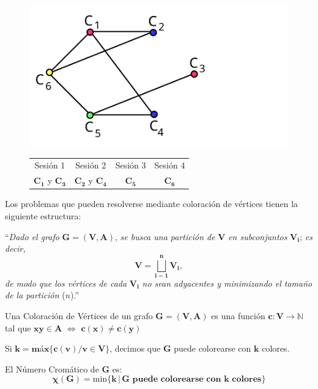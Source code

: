 \documentclass[twoside]{report}
\newcommand{\bs}[1]{\boldsymbol{#1}}
\begin{document}
           \begin{figure}[h!]\centering
           \includegraphics[scale=0.3]{pdfs/color6.pdf}
           \begin{tabular}{cccc}
                  Sesi\'{o}n 1 & Sesi\'{o}n 2 & Sesi\'{o}n 3 & Sesi\'{o}n 4 \\
                  $\bs{C_1}$ y $\bs{C_3}$ & $\bs{C_2}$ y $\bs{C_4}$ & $\bs{C_5}$ & $\bs{C_6}$
            \end{tabular}
           \end{figure}

Los problemas que pueden resolverse mediante coloraci\'{o}n de v\'{e}rtices tienen la siguiente estructura:
\vspace{0.2cm}

``\emph{Dado el grafo} $\bs{G=(V,A)}$, \emph{se busca una partici\'{o}n de }$\bs{V}$ \emph{en subconjuntos }$\bs{V_i}$; \emph{es decir,}
$$\bs{V=\bigsqcup_{i=1}^{n}V_i},$$ \emph{de modo que los v\'{e}rtices de cada} $\bs{V_i}$ \emph{no sean adyacentes y minimizando el tama\~{n}o de la partici\'{o}n }($n$).''
\vspace{0.4cm}

\begin{defi}
Una Coloraci\'{o}n de V\'{e}rtices de un grafo $\bs{G=(V,A)}$ es una funci\'{o}n $\bs{c:V\rightarrow\mathbb{N}}$ tal que
$\bs{xy\in A\,\,\Leftrightarrow\,\,c(x)\neq c(y)}$
\end{defi}

\begin{defi}
Si $\bs{k=\mbox{m\'{a}x}\{c(v)/v\in V\}}$, decimos que  $\bs{G}$ puede colorearse con $\bs{k}$ colores.
\end{defi}

\begin{defi}
El N\'{u}mero Crom\'{a}tico de $\bs{G}$ es:
        $$\bs{\chi(G)=\mathrm{min}\{k\,|\,G \mbox{ puede colorearse con } k \mbox{ colores}\}}$$
\end{defi}
\end{document}
